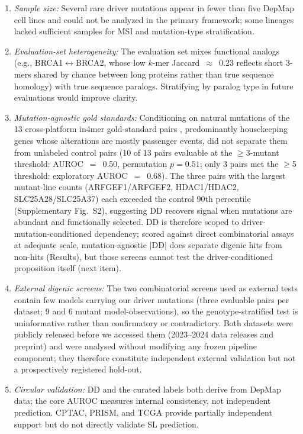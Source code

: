 \documentclass[11pt,a4paper]{article}
\begin{document}
\begin{enumerate}\setlength\itemsep{1pt}
\item \textit{Sample size:} Several rare driver mutations appear in fewer than five DepMap cell lines and could not be analyzed in the primary framework; some lineages lacked sufficient samples for MSI and mutation-type stratification.
\item \textit{Evaluation-set heterogeneity:} The evaluation set mixes functional analogs (e.g., BRCA1$\leftrightarrow$BRCA2, whose low $k$-mer Jaccard~$\approx$~0.23 reflects short 3-mers shared by chance between long proteins rather than true sequence homology) with true sequence paralogs. Stratifying by paralog type in future evaluations would improve clarity.
\item \textit{Mutation-agnostic gold standards:} Conditioning on natural mutations of the 13 cross-platform in4mer gold-standard pairs \cite{EsmaeiliAnvar2024}, predominantly housekeeping genes whose alterations are mostly passenger events, did not separate them from unlabeled control pairs (10 of 13 pairs evaluable at the $\ge$3-mutant threshold: AUROC~$=$~0.50, permutation $p=0.51$; only 3 pairs met the $\ge$5 threshold: exploratory AUROC~$=$~0.68). The three pairs with the largest mutant-line counts (ARFGEF1/ARFGEF2, HDAC1/HDAC2, SLC25A28/SLC25A37) each exceeded the control 90th percentile (Supplementary Fig.~S2), suggesting DD recovers signal when mutations are abundant and functionally selected. DD is therefore scoped to driver-mutation-conditioned dependency; scored against direct combinatorial assays at adequate scale, mutation-agnostic $|$DD$|$ does separate digenic hits from non-hits (Results), but those screens cannot test the driver-conditioned proposition itself (next item).
\item \textit{External digenic screens:} The two combinatorial screens used as external tests contain few models carrying our driver mutations (three evaluable pairs per dataset; 9 and 6 mutant model-observations), so the genotype-stratified test is uninformative rather than confirmatory or contradictory. Both datasets were publicly released before we accessed them (2023--2024 data releases and preprint) and were analysed without modifying any frozen pipeline component; they therefore constitute independent external validation but not a prospectively registered hold-out.
\item \textit{Circular validation:} DD and the curated labels both derive from DepMap data; the core AUROC measures internal consistency, not independent prediction. CPTAC, PRISM, and TCGA provide partially independent support but do not directly validate SL prediction.

\end{enumerate}
\end{document}
